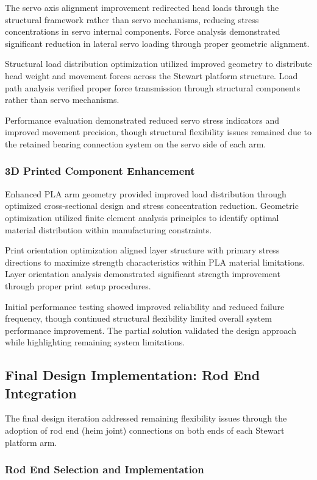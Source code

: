 The servo axis alignment improvement redirected head loads through the structural framework rather than servo mechanisms, reducing stress concentrations in servo internal components. Force analysis demonstrated significant reduction in lateral servo loading through proper geometric alignment.

Structural load distribution optimization utilized improved geometry to distribute head weight and movement forces across the Stewart platform structure. Load path analysis verified proper force transmission through structural components rather than servo mechanisms.

Performance evaluation demonstrated reduced servo stress indicators and improved movement precision, though structural flexibility issues remained due to the retained bearing connection system on the servo side of each arm.

\subsubsection{ 3D Printed Component Enhancement}

Enhanced PLA arm geometry provided improved load distribution through optimized cross-sectional design and stress concentration reduction. Geometric optimization utilized finite element analysis principles to identify optimal material distribution within manufacturing constraints.

Print orientation optimization aligned layer structure with primary stress directions to maximize strength characteristics within PLA material limitations. Layer orientation analysis demonstrated significant strength improvement through proper print setup procedures.

Initial performance testing showed improved reliability and reduced failure frequency, though continued structural flexibility limited overall system performance improvement. The partial solution validated the design approach while highlighting remaining system limitations.

\subsection{Final Design Implementation: Rod End Integration}

The final design iteration addressed remaining flexibility issues through the adoption of rod end (heim joint) connections on both ends of each Stewart platform arm.

\subsubsection{Rod End Selection and Implementation}

